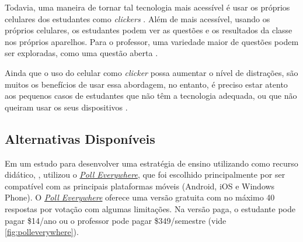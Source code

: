 Todavia, uma maneira de tornar tal tecnologia mais acessível é usar os próprios
celulares dos estudantes como \textit{clickers} \cite{Stowell2015, Morrell2015, Araujo2013}.
Além de mais acessível, usando os próprios celulares, os estudantes podem
ver as questões e os resultados da classe nos próprios aparelhos. Para o professor,
uma variedade maior de questões podem ser exploradas, como uma  questão aberta \cite{Stowell2015}.


Ainda que o uso do celular como \textit{clicker} possa aumentar o nível de
distrações, são muitos os benefícios de usar essa abordagem, no entanto,
é preciso estar atento aos pequenos casos de estudantes que não têm a tecnologia
adequada, ou que não queiram usar os seus dispositivos \cite{Morrell2015, Stowell2015}.

%

\subsection{Alternativas Disponíveis}
\label{subp:alternativas_disponiveis}

Em um estudo para desenvolver uma estratégia de ensino utilizando
{\clickers} como recurso didático, , utilizou o
\href{https://www.polleverywhere.com/}{\textit{Poll Everywhere}}, que foi
escolhido principalmente por ser compatível com as principais plataformas
móveis (Android, iOS e Windows Phone). O
\href{https://www.polleverywhere.com/}{\textit{Poll Everywhere}} oferece uma
versão gratuita com no máximo 40 respostas por votação com algumas limitações.
Na versão paga, o estudante pode pagar \$14/ano ou o professor pode pagar
\$349/semestre (vide \autoref{fig:polleverywhere}).

